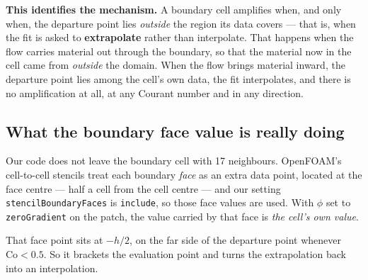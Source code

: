 \documentclass[11pt,a4paper]{article}
\begin{document}
\textbf{This identifies the mechanism.} A boundary cell amplifies when, and only when, the
departure point lies \emph{outside} the region its data covers --- that is, when the fit is
asked to \textbf{extrapolate} rather than interpolate. That happens when the flow carries
material out through the boundary, so that the material now in the cell came from
\emph{outside} the domain. When the flow brings material inward, the departure point lies
among the cell's own data, the fit interpolates, and there is no amplification at all, at any
Courant number and in any direction.

\begin{center}
\end{center}

\subsection{What the boundary face value is really doing}
\label{sec:facevalue}

Our code does not leave the boundary cell with 17 neighbours. OpenFOAM's cell-to-cell
stencils treat each boundary \emph{face} as an extra data point, located at the face centre
--- half a cell from the cell centre --- and our setting \texttt{stencilBoundaryFaces} is
\texttt{include}, so those face values are used. With $\phi$ set to \texttt{zeroGradient} on
the patch, the value carried by that face is \emph{the cell's own value}.

That face point sits at $-h/2$, on the far side of the departure point whenever
$\mathrm{Co} < 0.5$. So it brackets the evaluation point and turns the extrapolation back
into an interpolation.
\end{document}

